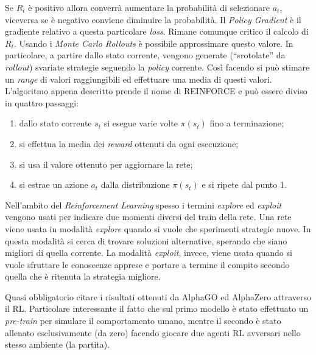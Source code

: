 Se $R_t$ è positivo allora converrà aumentare la probabilità di selezionare $a_t$, viceversa se è negativo conviene diminuire la probabilità.
Il \emph{Policy Gradient} è il gradiente relativo a questa particolare \emph{loss}.
Rimane comunque critico il calcolo di $R_t$.
Usando i \emph{Monte Carlo Rollouts} è possibile approssimare questo valore.
In particolare, a partire dallo stato corrente, vengono generate (``srotolate'' da \emph{rollout}) svariate strategie seguendo la \emph{policy} corrente.
Così facendo si può stimare un \emph{range} di valori raggiungibili ed effettuare una media di questi valori.
L'algoritmo appena descritto prende il nome di REINFORCE e può essere diviso in quattro passaggi:
\begin{enumerate}
  \item dallo stato corrente $s_t$ si esegue varie volte $\pi(s_t)$ fino a terminazione;
  \item si effettua la media dei \emph{reward} ottenuti da ogni esecuzione;
  \item si usa il valore ottenuto per aggiornare la rete;
  \item si estrae un azione $a_t$ dalla distribuzione $\pi(s_t)$ e si ripete dal punto 1.
\end{enumerate}
Nell'ambito del \emph{Reinforcement Learning} spesso i termini \emph{explore} ed \emph{exploit} vengono usati per indicare due momenti diversi del train della rete.
Una rete viene usata in modalità \emph{explore} quando si vuole che sperimenti strategie nuove.
In questa modalità si cerca di trovare soluzioni alternative, sperando che siano migliori di quella corrente.
La modalità \emph{exploit}, invece, viene usata quando si vuole sfruttare le conoscenze apprese e portare a termine il compito secondo quella che è ritenuta la strategia migliore.

Quasi obbligatorio citare i risultati ottenuti da AlphaGO \cite{AlphaGO} ed AlphaZero \cite{AlphaZero} attraverso il RL.
Particolare interessante il fatto che sul primo modello è stato effettuato un \emph{pre-train} per simulare il comportamento umano, mentre il secondo è stato allenato esclusivamente (da zero) facendo giocare due agenti RL avversari nello stesso ambiente (la partita).
















